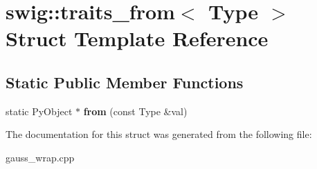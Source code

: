 \hypertarget{structswig_1_1traits__from}{\section{swig\-:\-:traits\-\_\-from$<$ Type $>$ Struct Template Reference}
\label{structswig_1_1traits__from}
}
\subsection*{Static Public Member Functions}
\begin{DoxyCompactItemize}
\item 
\hypertarget{structswig_1_1traits__from_a502976b6bea889bcc35d0aed72e8d901}{static Py\-Object $\ast$ {\bfseries from} (const Type \&val)}\label{structswig_1_1traits__from_a502976b6bea889bcc35d0aed72e8d901}

\end{DoxyCompactItemize}


The documentation for this struct was generated from the following file\-:\begin{DoxyCompactItemize}
\item 
gauss\-\_\-wrap.\-cpp\end{DoxyCompactItemize}
